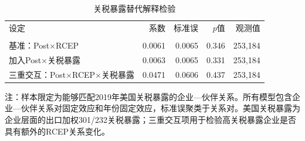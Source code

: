 \begin{table}[htbp]
\centering
\caption{关税暴露替代解释检验}
\label{tab:exclusion}
\small
\begin{tabular}{lrrrr}
\toprule
设定 & 系数 & 标准误 & $p$值 & 观测值 \\\\
\midrule
基准：Post$\times$RCEP & 0.0061 & 0.0065 & 0.346 & 253,184 \\
加入Post$\times$关税暴露 & 0.0063 & 0.0065 & 0.331 & 253,184 \\
三重交互：Post$\times$RCEP$\times$关税暴露 & 0.0471 & 0.0606 & 0.437 & 253,184 \\
\bottomrule
\end{tabular}
\begin{tablenotes}
\footnotesize 注：样本限定为能够匹配2019年美国关税暴露的企业—伙伴关系。所有模型包含企业—伙伴关系对固定效应和年份固定效应，标准误聚类于关系对。美国关税暴露为企业层面的出口加权301/232关税暴露；三重交互项用于检验高关税暴露企业是否具有额外的RCEP关系变化。
\end{tablenotes}
\end{table}